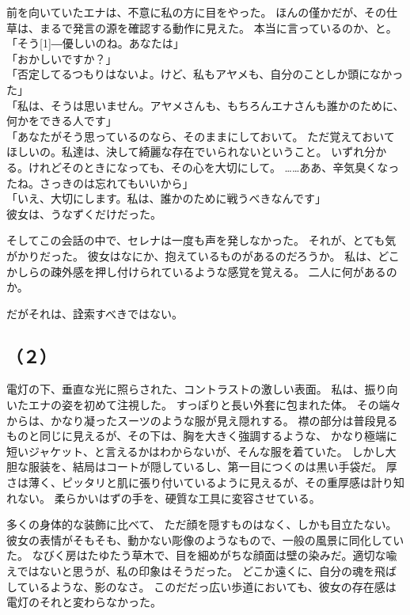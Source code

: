 \documentclass[../IHMain]{subfiles}
\begin{document}
前を向いていたエナは、不意に私の方に目をやった。
ほんの僅かだが、その仕草は、まるで発言の源を確認する動作に見えた。
本当に言っているのか、と。\\
「そう\scalebox{3}[1]{―}優しいのね。あなたは」\\
「おかしいですか？」\\
「否定してるつもりはないよ。けど、私もアヤメも、自分のことしか頭になかった」\\
「私は、そうは思いません。アヤメさんも、もちろんエナさんも誰かのために、何かをできる人です」\\
「あなたがそう思っているのなら、そのままにしておいて。
ただ覚えておいてほしいの。私達は、決して綺麗な存在でいられないということ。
いずれ分かる。けれどそのときになっても、その心を大切にして。
……ああ、辛気臭くなったね。さっきのは忘れてもいいから」\\
「いえ、大切にします。私は、誰かのために戦うべきなんです」\\
彼女は、うなずくだけだった。

そしてこの会話の中で、セレナは一度も声を発しなかった。
それが、とても気がかりだった。
彼女はなにか、抱えているものがあるのだろうか。
私は、どこかしらの疎外感を押し付けられているような感覚を覚える。
二人に何があるのか。

だがそれは、詮索すべきではない。

\subsection*{（２）}
電灯の下、垂直な光に照らされた、コントラストの激しい表面。
私は、振り向いたエナの姿を初めて注視した。
すっぽりと長い外套に包まれた体。
その端々からは、かなり凝ったスーツのような服が見え隠れする。
襟の部分は普段見るものと同じに見えるが、その下は、胸を大きく強調するような、
かなり極端に短いジャケット、と言えるかはわからないが、そんな服を着ていた。
しかし大胆な服装を、結局はコートが隠しているし、第一目につくのは黒い手袋だ。
厚さは薄く、ピッタリと肌に張り付いているように見えるが、その重厚感は計り知れない。
柔らかいはずの手を、硬質な工具に変容させている。

多くの身体的な装飾に比べて、
ただ顔を隠すものはなく、しかも目立たない。
彼女の表情がそもそも、動かない彫像のようなもので、一般の風景に同化していた。
なびく房はたゆたう草木で、目を細めがちな顔面は壁の染みだ。適切な喩えではないと思うが、私の印象はそうだった。
どこか遠くに、自分の魂を飛ばしているような、影のなさ。
このだだっ広い歩道においても、彼女の存在感は電灯のそれと変わらなかった。
\end{document}
